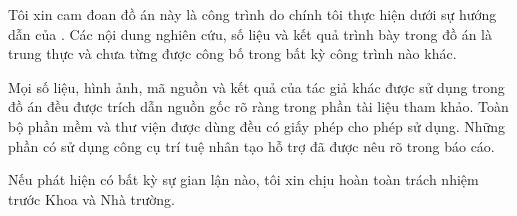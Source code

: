 \begin{declaration}

\begin{chuy}
\end{chuy}

Tôi xin cam đoan đồ án này là công trình do chính tôi thực hiện dưới sự
hướng dẫn của \dauGVHD. Các nội dung nghiên cứu, số liệu và kết quả trình
bày trong đồ án là trung thực và chưa từng được công bố trong bất kỳ công
trình nào khác.

Mọi số liệu, hình ảnh, mã nguồn và kết quả của tác giả khác được sử dụng
trong đồ án đều được trích dẫn nguồn gốc rõ ràng trong phần tài liệu tham
khảo. Toàn bộ phần mềm và thư viện được dùng đều có giấy phép cho phép sử
dụng. Những phần có sử dụng công cụ trí tuệ nhân tạo hỗ trợ đã được nêu rõ
trong báo cáo.

Nếu phát hiện có bất kỳ sự gian lận nào, tôi xin chịu hoàn toàn trách nhiệm
trước Khoa và Nhà trường.

\vspace{1.4em}
\hfill{}

\end{declaration}
